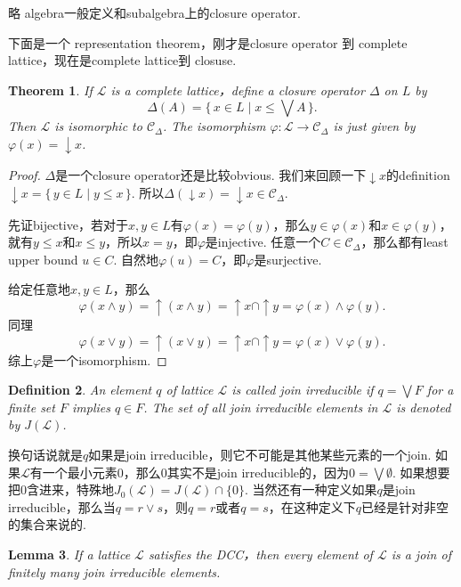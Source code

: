 \documentclass{article}
\newtheorem{theorem}{Theorem}[section]
\newtheorem{lemma}[theorem]{Lemma}
\newtheorem{definition}[theorem]{Definition}
\newcommand*{\xfunc}[4]{{#2}\colon{#3}{#1}{#4}}
\newcommand*{\func}[3]{\xfunc{\to}{#1}{#2}{#3}}
\newcommand\Set[2]{\{\,#1\mid#2\,\}} %
\newcommand\lattice{\mathcal{L}}
\begin{document}
略{\color{red} algebra一般定义和subalgebra上的closure operator}.

下面是一个{\color{red} representation theorem，刚才是closure operator 到 complete lattice，现在是complete lattice到 closuse}.

\begin{theorem}
\rm If $\lattice$ is a complete lattice，define a closure operator $\Delta$ on $L$ by
$$
\Delta(A) = \Set{x \in L}{x \leq \bigvee A}.
$$
Then {\color{red} $\lattice$ is isomorphic to $\mathcal{C}_{\Delta}$}. The isomorphism $\func{\varphi}{\lattice}{\mathcal{C}_{\Delta}}$ is just given by $\varphi(x) = \downarrow x$.
\end{theorem}

\begin{proof}
$\Delta$是一个closure operator还是比较obvious. 我们来回顾一下$\downarrow x$的definition $\downarrow x = \Set{y \in L}{ y \leq x}$. 所以$\Delta(\downarrow x) = \downarrow x \in \mathcal{C}_{\Delta}$.

先证bijective，若对于$x,y \in L$有$\varphi(x) = \varphi(y)$，那么$y \in \varphi(x)$和$x \in \varphi(y)$，就有$y \leq x$和$x \leq y$，所以$x = y$，即$\varphi$是injective. 任意一个$C \in \mathcal{C}_{\Delta}$，那么都有least upper bound $u \in C$. 自然地$\varphi(u) = C$，即$\varphi$是surjective.

给定任意地$x,y \in L$，那么
$$
\varphi(x \wedge y) = \uparrow (x \wedge y) = \uparrow x \cap \uparrow y = \varphi(x) \wedge \varphi(y).
$$
同理
$$
\varphi(x \vee y) = \uparrow (x \vee y) = \uparrow x \cap \uparrow y = \varphi(x) \vee \varphi(y).
$$
综上$\varphi$是一个isomorphism.
\end{proof}

\begin{definition}
\rm An element $q$ of lattice $\lattice$ is called {\color{red} join irreducible} if $q = \bigvee F$ for a finite set $F$ implies $q \in F$. The set of all join irreducible elements in $\lattice$ is denoted by $J(\lattice)$.
\end{definition}

{\color{blue} 换句话说就是$q$如果是join irreducible，则它不可能是其他某些元素的一个join}. {\color{red} 如果$\lattice$有一个最小元素0，那么0其实不是join irreducible的，因为$0 = \bigvee \emptyset$. 如果想要把0含进来，特殊地$J_0(\lattice) =J(\lattice) \cap \{0\}$. 当然还有一种定义如果$q$是join irreducible，那么当$q = r \vee s$，则$q = r$或者$q =s$，在这种定义下$q$已经是针对非空的集合来说的}. 

\begin{lemma}
\rm If a lattice $\lattice$ satisfies the DCC，then every element of $\lattice$ is a join of finitely many join irreducible elements.
\end{lemma}
\end{document}
